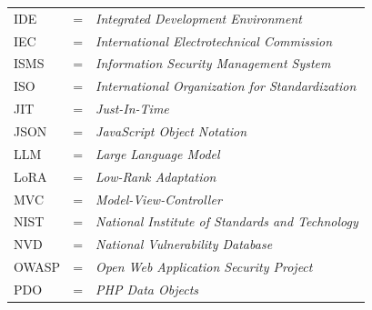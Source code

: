 \begin{center}
\begin{tabular}{llp{3in}}
	IDE & \hspace{1.5cm} = & \textit{Integrated Development Environment} \\
	IEC & \hspace{1.5cm} = & \textit{International Electrotechnical Commission} \\
	ISMS & \hspace{1.5cm} = & \textit{Information Security Management System} \\
	ISO & \hspace{1.5cm} = & \textit{International Organization for Standardization} \\
	JIT & \hspace{1.5cm} = & \textit{Just-In-Time} \\
	JSON & \hspace{1.5cm} = & \textit{JavaScript Object Notation} \\
	LLM & \hspace{1.5cm} = & \textit{Large Language Model} \\
	LoRA & \hspace{1.5cm} = & \textit{Low-Rank Adaptation} \\
	MVC & \hspace{1.5cm} = & \textit{Model-View-Controller} \\
	NIST & \hspace{1.5cm} = & \textit{National Institute of Standards and Technology} \\
	NVD & \hspace{1.5cm} = & \textit{National Vulnerability Database} \\
	OWASP & \hspace{1.5cm} = & \textit{Open Web Application Security Project} \\
	PDO & \hspace{1.5cm} = & \textit{PHP Data Objects} \\
\end{tabular}
\end{center}